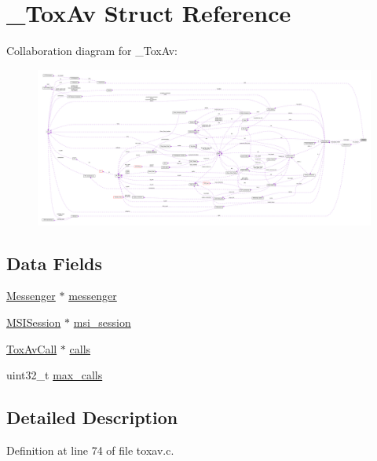 \hypertarget{struct___tox_av}{\section{\+\_\+\+Tox\+Av Struct Reference}
\label{struct___tox_av}
}


Collaboration diagram for \+\_\+\+Tox\+Av\+:
\nopagebreak
\begin{figure}[H]
\begin{center}
\leavevmode
\includegraphics[width=350pt]{d9/d45/struct___tox_av__coll__graph}
\end{center}
\end{figure}
\subsection*{Data Fields}
\begin{DoxyCompactItemize}
\item 
\hyperlink{struct_messenger}{Messenger} $\ast$ \hyperlink{struct___tox_av_a48342badc24a04d2310ca16ff4a3711b}{messenger}
\item 
\hyperlink{msi_8h_adc69aa9b8f2f21b2b54e542cc9bb4329}{M\+S\+I\+Session} $\ast$ \hyperlink{struct___tox_av_a85e3d7dd2ab722ee5ba0cd4b72bc7d60}{msi\+\_\+session}
\item 
\hyperlink{toxav_8c_aec40f142d19ca255ccdf4097b03ef51e}{Tox\+Av\+Call} $\ast$ \hyperlink{struct___tox_av_abe854f89ac28ebd5112d1639d531b128}{calls}
\item 
uint32\+\_\+t \hyperlink{struct___tox_av_a7d6cf32eb812384ebd4074c588c17499}{max\+\_\+calls}
\end{DoxyCompactItemize}


\subsection{Detailed Description}


Definition at line 74 of file toxav.\+c.



